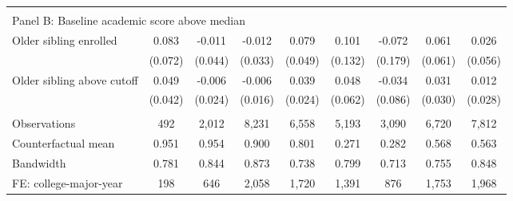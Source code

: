 {{\begin{tabular}{lcccccccc}
&  &  &  & & & & & &    \\
\multicolumn{9}{l}{Panel B: Baseline academic score above median} \\
Older sibling enrolled&       0.083   &      -0.011   &      -0.012   &       0.079   &       0.101   &      -0.072   &       0.061   &       0.026   \\
                    &     (0.072)   &     (0.044)   &     (0.033)   &     (0.049)   &     (0.132)   &     (0.179)   &     (0.061)   &     (0.056)   \\
 
Older sibling above cutoff&       0.049   &      -0.006   &      -0.006   &       0.039   &       0.048   &      -0.034   &       0.031   &       0.012   \\
                    &     (0.042)   &     (0.024)   &     (0.016)   &     (0.024)   &     (0.062)   &     (0.086)   &     (0.030)   &     (0.028)   \\
                    &               &               &               &               &               &               &               &               \\
Observations        &         492   &       2,012   &       8,231   &       6,558   &       5,193   &       3,090   &       6,720   &       7,812   \\
Counterfactual mean &       0.951   &       0.954   &       0.900   &       0.801   &       0.271   &       0.282   &       0.568   &       0.563   \\
Bandwidth           &       0.781   &       0.844   &       0.873   &       0.738   &       0.799   &       0.713   &       0.755   &       0.848   \\
FE: college-major-year&         198   &         646   &       2,058   &       1,720   &       1,391   &         876   &       1,753   &       1,968   \\
 

\bottomrule
\end{tabular}
}
}
